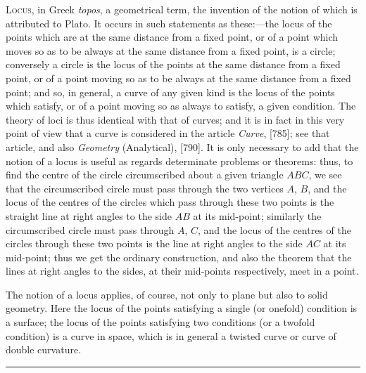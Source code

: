 \documentclass[11pt,a4paper]{book}
\begin{document}

\smallskip

\textsc{Locus,} in Greek \textit{topos}, a geometrical term, the invention of the notion of which is attributed to Plato. It occurs in such statements as these:---the locus of the points which are at the same distance from a fixed point, or of a point which moves so as to be always at the same distance from a fixed point, is a circle; conversely a circle is the locus of the points at the same distance from a fixed point, or of a point moving so as to be always at the same distance from a fixed point; and so, in general, a curve of any given kind is the locus of the points which satisfy, or of a point moving so as always to satisfy, a given condition. The theory of loci is thus identical with that of curves; and it is in fact in this very point of view that a curve is considered in the article \textit{Curve}, [785]; see that article, and also \textit{Geometry} (Analytical), [790]. It is only necessary to add that the notion of a locus is useful as regards determinate problems or theorems: thus, to find the centre of the circle circumscribed about a given triangle $ABC$, we see that the circumscribed circle must pass through the two vertices $A$, $B$, and the locus of the centres of the circles which pass through these two points is the straight line at right angles to the side $AB$ at its mid-point; similarly the circumscribed circle must pass through $A$, $C$, and the locus of the centres of the circles through these two points is the line at right angles to the side $AC$ at its mid-point; thus we get the ordinary construction, and also the theorem that the lines at right angles to the sides, at their mid-points respectively, meet in a point.

The notion of a locus applies, of course, not only to plane but also to solid geometry. Here the locus of the points satisfying a single (or onefold) condition is a surface; the locus of the points satisfying two conditions (or a twofold condition) is a curve in space, which is in general a twisted curve or curve of double curvature.

\vspace{1em}
\hrule
\vspace{1em}


\end{document}
